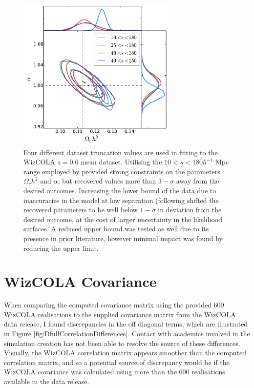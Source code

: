 \documentclass[titlesmallcaps, examinerscopy, copyrightpage]{uqthesis}
\begin{document}
\begin{appendices}
\begin{figure}[h!]
  \begin{center}
    \includegraphics[width=0.7\textwidth]{images/CdatasetTrunc.pdf}
  \end{center}
  \caption{Four different dataset truncation values are used in fitting to the WizCOLA $z=0.6$ mean dataset. Utilising the $10<s<180 h^{-1}$ Mpc range employed by \citet{BlakeDavis2011} provided strong constraints on the parameters $\Omega_c h^2$ and $\alpha$, but recovered values more than $3-\sigma$ away from the desired outcomes. Increasing the lower bound of the data due to inaccuracies in the model at low separation (following \citet{ChuangWang2012} shifted the recovered parameters to be well below $1-\sigma$ in deviation from the desired outcome, at the cost of larger uncertainty in the likelihood surfaces. A reduced upper bound was tested as well due to its presence in prior literature, however minimal impact was found by reducing the upper limit.}
  \label{fig:CdatasetTrunc}
\end{figure}



\chapter{WizCOLA Covariance} \label{app:wizDiff}


When comparing the computed covariance matrix using the provided 600 WizCOLA realisations to the supplied covariance matrix from the WizCOLA data release, I found discrepancies in the off diagonal terms, which are illustrated in Figure \ref{fig:DfullCorrelationDifferences}. Contact with academics involved in the simulation creation has not been able to resolve the source of these differences. Visually, the WizCOLA correlation matrix appears smoother than the computed correlation matrix, and so a potential source of discrepancy would be if the WizCOLA covariance was calculated using more than the 600 realisations available in the data release.


\end{appendices}
\end{document}

